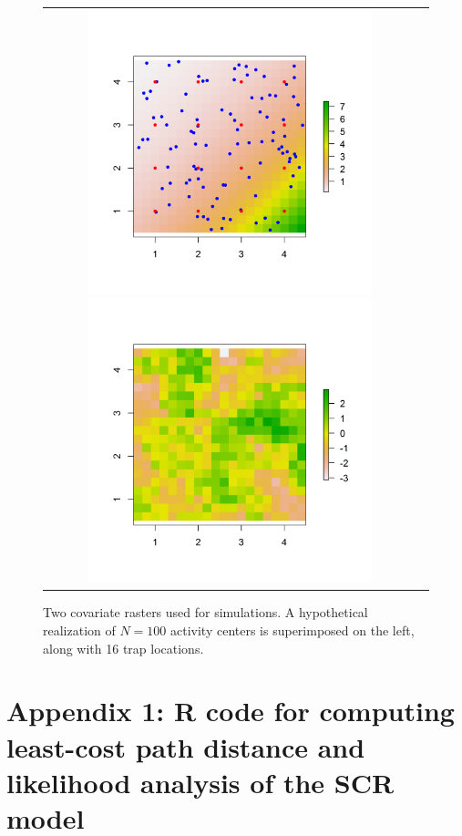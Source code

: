 \documentclass[12pt]{article}
\begin{document}
\begin{figure}
\begin{tabular}{cc}
\includegraphics[height=3.25in,width=3.25in]{figs/raster_withN100}
\includegraphics[height=3.25in,width=3.25in]{figs/raster_krige} &
\end{tabular}
\caption{Two covariate rasters used for simulations. A hypothetical
  realization of $N=100$ activity centers is superimposed on the left,
along with 16 trap locations. }
\label{ecoldist.fig.raster100}
\end{figure}




\clearpage





\newpage



\newpage

\newpage

\newpage


\section*{Appendix 1: {\bf R} code for computing least-cost path
  distance and likelihood analysis of the SCR model}
\end{document}

